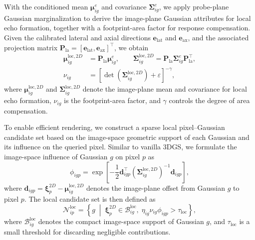 With the conditioned mean $\boldsymbol\mu^{e}_{ig}$ and covariance
$\boldsymbol\Sigma^{e}_{ig}$, we apply probe-plane Gaussian
marginalization to derive the image-plane Gaussian attributes for local echo
formation, together with a footprint-area factor for response compensation.
Given the calibrated lateral and axial directions
$\mathbf e_{\mathrm{lat}}$ and $\mathbf e_{\mathrm{ax}}$, and the associated
projection matrix
$\mathbf P_{\mathrm{la}}
=
[\mathbf e_{\mathrm{lat}},
\mathbf e_{\mathrm{ax}}]^\top$,
we obtain
\begin{equation}
\begin{aligned}
\boldsymbol\mu^{\mathrm{loc},2D}_{ig}
&=
\mathbf P_{\mathrm{la}}
\boldsymbol\mu^{e}_{ig},
\qquad
\boldsymbol\Sigma^{\mathrm{loc},2D}_{ig}
=
\mathbf P_{\mathrm{la}}
\boldsymbol\Sigma^{e}_{ig}
\mathbf P_{\mathrm{la}}^\top,
\\
\nu_{ig}
&=
\left[
\det
\left(
\boldsymbol\Sigma^{\mathrm{loc},2D}_{ig}
\right)
+
\varepsilon
\right]^{-\gamma},
\end{aligned}
\label{eq:local-image-attributes}
\end{equation}
where $\boldsymbol\mu^{\mathrm{loc},2D}_{ig}$ and
$\boldsymbol\Sigma^{\mathrm{loc},2D}_{ig}$ denote the image-plane mean and
covariance for local echo formation, $\nu_{ig}$ is the footprint-area factor,
and $\gamma$ controls the degree of area compensation.

To enable efficient rendering, we construct a sparse local pixel--Gaussian
candidate set based on the image-space geometric support of each Gaussian and
its influence on the queried pixel. Similar to vanilla 3DGS, 
we formulate the image-space influence of Gaussian
$g$ on pixel $p$ as
\begin{equation}
\phi_{igp}
=
\exp
\left[
-\frac{1}{2}
\mathbf d_{igp}^{\top}
\left(
\boldsymbol\Sigma^{\mathrm{loc},2D}_{ig}
\right)^{-1}
\mathbf d_{igp}
\right],
\label{eq:local-gaussian-response}
\end{equation}
where
$\mathbf d_{igp}
=
\boldsymbol\xi^{2D}_{p}
-
\boldsymbol\mu^{\mathrm{loc},2D}_{ig}$
denotes the image-plane offset from Gaussian $g$ to pixel $p$.
The local candidate set is then defined as
\begin{equation}
\mathcal N^{\mathrm{loc}}_{ip}
=
\left\{
g
\;\middle|\;
\boldsymbol\xi^{2D}_{p}
\in
\mathcal B^{\mathrm{loc}}_{ig},
\;
\eta_{ig}\nu_{ig}\phi_{igp}
>
\tau_{\mathrm{loc}}
\right\},
\label{eq:local-candidate-set}
\end{equation}
where $\mathcal B^{\mathrm{loc}}_{ig}$ denotes the compact image-space support
of Gaussian $g$, and $\tau_{\mathrm{loc}}$ is a small threshold for discarding
negligible contributions.

